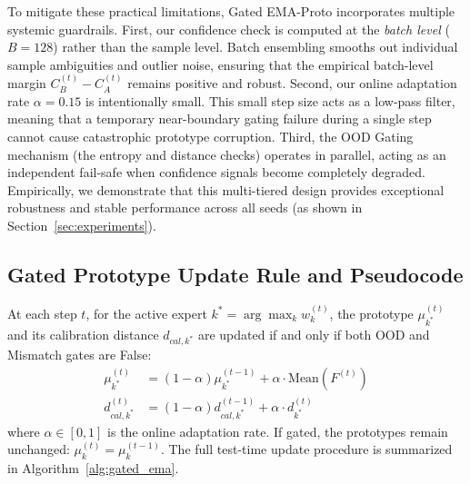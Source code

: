 \documentclass{article}
\theoremstyle{plain}
\theoremstyle{definition}
\theoremstyle{remark}
\begin{document}
To mitigate these practical limitations, Gated EMA-Proto incorporates multiple systemic guardrails. First, our confidence check is computed at the \textit{batch level} ($B=128$) rather than the sample level. Batch ensembling smooths out individual sample ambiguities and outlier noise, ensuring that the empirical batch-level margin $C_B^{(t)} - C_A^{(t)}$ remains positive and robust. Second, our online adaptation rate $\alpha = 0.15$ is intentionally small. This small step size acts as a low-pass filter, meaning that a temporary near-boundary gating failure during a single step cannot cause catastrophic prototype corruption. Third, the OOD Gating mechanism (the entropy and distance checks) operates in parallel, acting as an independent fail-safe when confidence signals become completely degraded. Empirically, we demonstrate that this multi-tiered design provides exceptional robustness and stable performance across all seeds (as shown in Section~\ref{sec:experiments}).

\subsection{Gated Prototype Update Rule and Pseudocode}
At each step $t$, for the active expert $k^* = \arg\max_k w_k^{(t)}$, the prototype $\mu_{k^*}^{(t)}$ and its calibration distance $d_{cal, {k^*}}$ are updated if and only if both OOD and Mismatch gates are False:
\begin{align}
    \mu_{k^*}^{(t)} &= (1 - \alpha) \mu_{k^*}^{(t-1)} + \alpha \cdot \text{Mean}(F^{(t)}) \\
    d_{cal, {k^*}}^{(t)} &= (1 - \alpha) d_{cal, {k^*}}^{(t-1)} + \alpha \cdot d_{k^*}^{(t)}
\end{align}
where $\alpha \in [0, 1]$ is the online adaptation rate. If gated, the prototypes remain unchanged: $\mu_k^{(t)} = \mu_k^{(t-1)}$. The full test-time update procedure is summarized in Algorithm~\ref{alg:gated_ema}.
\end{document}
